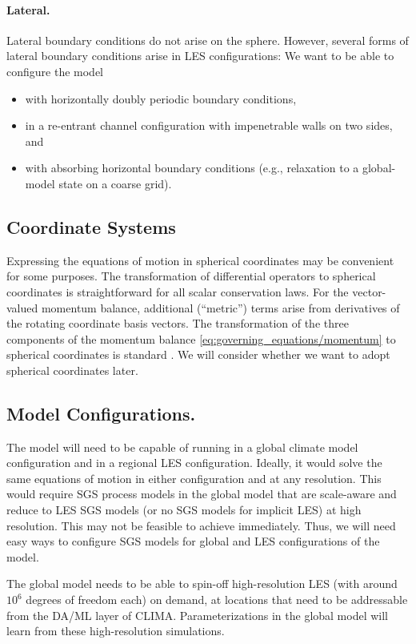 \documentclass{article}
\begin{document}
\paragraph{Lateral.} Lateral boundary conditions do not arise on the sphere. However, several forms of lateral boundary conditions arise in LES configurations: We want to be able to configure the model
\begin{itemize}
    \item with horizontally doubly periodic boundary conditions,
    \item in a re-entrant channel configuration with impenetrable walls on two sides, and 
    \item with absorbing horizontal boundary conditions (e.g., relaxation to a global-model state on a coarse grid). 
\end{itemize}

\subsection{Coordinate Systems}

Expressing the equations of motion in spherical coordinates may be convenient for some purposes. The transformation of differential operators to spherical coordinates is straightforward for all scalar conservation laws. For the vector-valued momentum balance, additional (``metric'') terms arise from derivatives of the rotating coordinate basis vectors. The transformation of the three components of the momentum balance \eqref{eq:governing_equations/momentum} to spherical coordinates is standard \citep[e.g.,][]{Staniforth03a}. We will consider whether we want to adopt spherical coordinates later. 

\subsection{Model Configurations.} The model will need to be capable of running in a global climate model configuration and in a regional LES configuration. Ideally, it would solve the same equations of motion in either configuration and at any resolution. This would require SGS process models in the global model that are scale-aware and reduce to LES SGS models (or no SGS models for implicit LES) at high resolution. This may not be feasible to achieve immediately. Thus, we will need easy ways to configure SGS models for global and LES configurations of the model. 

The global model needs to be able to spin-off high-resolution LES (with around $10^6$ degrees of freedom each) on demand, at locations that need to be addressable from the DA/ML layer of CLIMA. Parameterizations in the global model will learn from these high-resolution simulations. 
\end{document}
